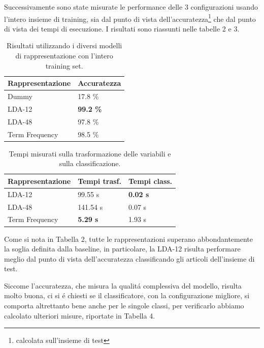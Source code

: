 \documentclass[runningheads]{llncs}
\begin{document}
Successivamente sono state misurate le performance delle 3 configurazioni usando l'intero insieme di training, sia dal punto di vista dell'accuratezza\footnote{calcolata sull'insieme di test} che dal punto di vista dei tempi di esecuzione. I risultati sono riassunti nelle tabelle 2 e 3.

\begin{table}[]
    \centering
\begin{tabular}{ll}
\hline
Rappresentazione & Accuratezza      \\ \hline
Dummy            & 17.8 \%          \\
LDA-12           & \textbf{99.2 \%} \\
LDA-48           & 97.8 \%          \\
Term Frequency   & 98.5 \% \\ \hline
\end{tabular}
    \caption{Risultati utilizzando i diversi modelli di rappresentazione con l'intero training set.}%
\end{table}

\begin{table}[]
    \centering
\begin{tabular}{lll}
\hline
Rappresentazione & Tempi trasf. & Tempi class. \\ \hline
LDA-12           & 99.55 s & \textbf{0.02 s} \\
LDA-48           & 141.54 s & 0.07 s   \\
Term Frequency   & \textbf{5.29 s} & 1.93 s \\ \hline
\end{tabular}
    \caption{Tempi misurati sulla trasformazione delle variabili e sulla classificazione.}%
\end{table}


Come si nota in Tabella 2, tutte le rappresentazioni superano abbondantemente la soglia definita dalla baseline, in particolare, la LDA-12 risulta performare meglio dal punto di vista dell'accuratezza classificando gli articoli dell'insieme di test.

\vskip 1.2in

Siccome l'accuratezza, che misura la qualit\'a complessiva del modello, risulta molto buona, ci si \'e chiesti se il classificatore, con la configurazione migliore, si comporta altrettanto bene anche per le singole classi, per verificarlo abbiamo calcolato ulteriori misure, riportate in Tabella 4.


%
\end{document}
